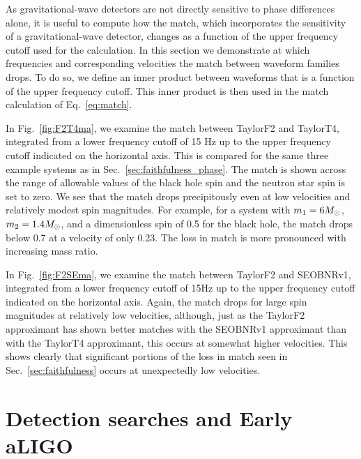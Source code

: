 As  gravitational-wave  detectors are not directly sensitive to phase differences alone, it
is useful to compute how the match, which incorporates the sensitivity of a
 gravitational-wave  detector, changes as a function of the upper frequency cutoff used for
the calculation. In this section we demonstrate at which frequencies and
corresponding velocities the match between waveform families drops. To do so,
we define an inner product between waveforms that is a function of the upper
frequency cutoff. This inner product is then used in the match calculation of
Eq.~\eqref{eq:match}.

In Fig.~\ref{fig:F2T4ma}, we examine the match between TaylorF2 and TaylorT4,
integrated from a lower frequency cutoff of 15 Hz up to the upper frequency
cutoff indicated on the horizontal axis. This is compared for the same three
example systems as in Sec.~\ref{sec:faithfulness_phase}. The match is shown
across the range of allowable values of the black hole spin and the neutron
star spin is set to zero. We see that the match drops precipitously even at low
velocities and relatively modest spin magnitudes. For example, for a system
with $m_1=6M_\odot$, $m_2=1.4M_\odot$, and a dimensionless spin of 0.5 for the
black hole, the match drops below 0.7 at a velocity of only 0.23. The loss in
match is more pronounced with increasing mass ratio. 

In Fig.~\ref{fig:F2SEma}, we examine the match between TaylorF2 and SEOBNRv1,
integrated from a lower frequency cutoff of 15Hz up to the upper frequency
cutoff indicated on the horizontal axis. Again, the match drops for large spin
magnitudes at relatively low velocities, although, just as the TaylorF2
approximant has shown better matches with the SEOBNRv1 approximant than with
the TaylorT4 approximant, this occurs at somewhat higher velocities. This shows
clearly that significant portions of the loss in match seen in
Sec.~\ref{sec:faithfulness} occurs at unexpectedly low velocities.


\section{Detection searches and Early aLIGO}
\label{sec:effectualness_and_flow}

